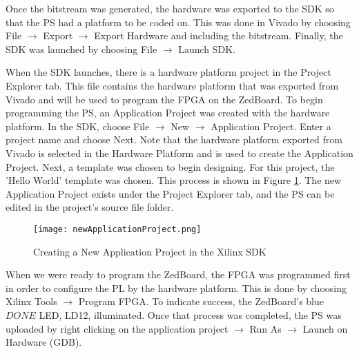 Once the bitstream was generated, the hardware was exported to the SDK so that the PS had a platform to be coded on. This was done in Vivado by choosing File $\rightarrow$ Export $\rightarrow$ Export Hardware and including the bitstream. Finally, the SDK was launched by choosing File $\rightarrow$ Launch SDK.
\par
When the SDK launches, there is a hardware platform project in the Project Explorer tab. This file contains the hardware platform that was exported from Vivado and will be used to program the FPGA on the ZedBoard. To begin programming the PS, an Application Project was created with the hardware platform. In the SDK, choose File $\rightarrow$ New $\rightarrow$ Application Project. Enter a project name and choose Next. Note that the hardware platform exported from Vivado is selected in the Hardware Platform and is used to create the Application Project. Next, a template was chosen to begin designing. For this project, the 'Hello World' template was chosen. This process is shown in Figure \ref{newApplicationProject}. The new Application Project exists under the Project Explorer tab, and the PS can be edited in the project's source file folder.

\begin{figure}[H]
	\centerline{\texttt{[image: newApplicationProject.png]}}
	\caption{Creating a New Application Project in the Xilinx SDK}
	\label{newApplicationProject}
\end{figure}

When we were ready to program the ZedBoard, the FPGA was programmed first in order to configure the PL by the hardware platform. This is done by choosing Xilinx Tools $\rightarrow$ Program FPGA. To indicate success, the ZedBoard's blue $DONE$ LED, LD12, illuminated. Once that process was completed, the PS was uploaded by right clicking on the application project $\rightarrow$ Run As $\rightarrow$ Launch on Hardware (GDB).



